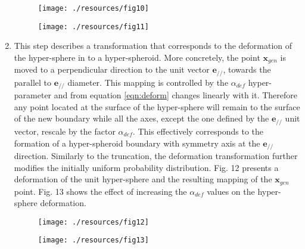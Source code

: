\documentclass[parskip=full]{scrartcl}
\begin{document}
\begin{enumerate}
	\begin{figure}[H]
		\centering
		\texttt{[image: ./resources/fig10]}
	\end{figure}

	\begin{figure}[H]
		\centering
		\texttt{[image: ./resources/fig11]}
	\end{figure}

	\item This step describes a transformation that corresponds to the
	deformation of the hyper-sphere in to a hyper-spheroid. More concretely, the
	point \( \textbf{x}_{gen} \) is moved to a perpendicular direction to the
	unit vector \( \textbf{e}_{\scriptscriptstyle//} \), towards the parallel to
	\( \textbf{e}_{\scriptscriptstyle//} \) diameter. This mapping is controlled
	by the \( \alpha_{def} \) hyper-parameter and from equation
	\eqref{eqn:deform} changes linearly with it. Therefore any point located at
	the surface of the hyper-sphere will remain to the surface of the new
	boundary while all the axes, except the one defined by the \(
	\textbf{e}_{\scriptscriptstyle//} \) unit vector, rescale by the factor \(
	\alpha_{def} \). This effectively corresponds to the formation of a
	hyper-spheroid boundary with symmetry axis at the \(
	\textbf{e}_{\scriptscriptstyle//} \) direction. Similarly to the truncation,
	the deformation transformation further modifies the initially uniform
	probability distribution. Fig. 12 presents a deformation of the unit
	hyper-sphere and the resulting mapping of the \( \textbf{x}_{gen} \) point.
	Fig. 13 shows the effect of increasing the \( \alpha_{def} \) values on the
	hyper-sphere deformation.

	\begin{figure}[H]
		\centering
		\texttt{[image: ./resources/fig12]}
	\end{figure}
	
	\begin{figure}[H]
		\centering
		\texttt{[image: ./resources/fig13]}
	\end{figure}


\end{enumerate}
\end{document}
